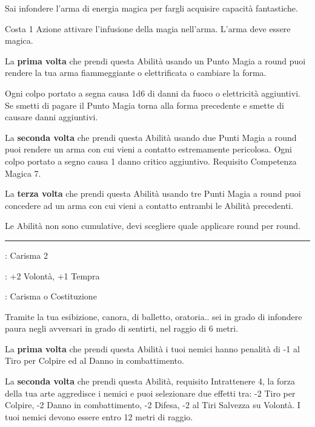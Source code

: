 \begin{multicols}{2}
Sai infondere l'arma di energia magica per fargli acquisire capacità fantastiche.

Costa 1 Azione attivare l'infusione della magia nell'arma. L'arma deve essere magica.

La \textbf{prima volta} che prendi questa Abilità usando un Punto Magia a round puoi rendere la tua arma fiammeggiante o elettrificata o cambiare la forma.

Ogni colpo portato a segna causa 1d6 di danni da fuoco o elettricità aggiuntivi. Se smetti di pagare il Punto Magia torna alla forma precedente e smette di causare danni aggiuntivi.

La \textbf{seconda volta} che prendi questa Abilità usando due Punti Magia a round puoi rendere un arma con cui vieni a contatto estremamente pericolosa. Ogni colpo portato a segno causa 1 danno critico aggiuntivo. Requisito Competenza Magica 7.

La \textbf{terza volta} che prendi questa Abilità usando tre Punti Magia a round puoi concedere ad un arma con cui vieni a contatto entrambi le Abilità precedenti.

Le Abilità non sono cumulative, devi scegliere quale applicare round per round.

\smallskip\noindent\rule{\linewidth}{2pt} \hypertarget{Infondere Paura}{}\medskip{}
\noindent
\begin{description}[noitemsep, topsep=0pt, parsep=0pt, partopsep=0pt, leftmargin=0cm, labelwidth=2.5cm]
    \item[\textbf{Requisito}]: Carisma 2
    \item[\textbf{Tiri Salvezza}]: +2 Volontà, +1 Tempra
    \item[\textbf{Caratteristica}]: Carisma o Costituzione
\end{description}

Tramite la tua esibizione, canora, di balletto, oratoria.. sei in grado di infondere paura negli avversari in grado di sentirti, nel raggio di 6 metri.

La \textbf{prima volta} che prendi questa Abilità i tuoi nemici hanno penalità di -1 al Tiro per Colpire ed al Danno in combattimento.

La \textbf{seconda volta} che prendi questa Abilità, requisito Intrattenere 4, la forza della tua arte aggredisce i nemici e puoi selezionare due effetti tra: -2 Tiro per Colpire, -2 Danno in combattimento, -2 Difesa, -2 al Tiri Salvezza su Volontà. I tuoi nemici devono essere entro 12 metri di raggio.


\end{multicols}
